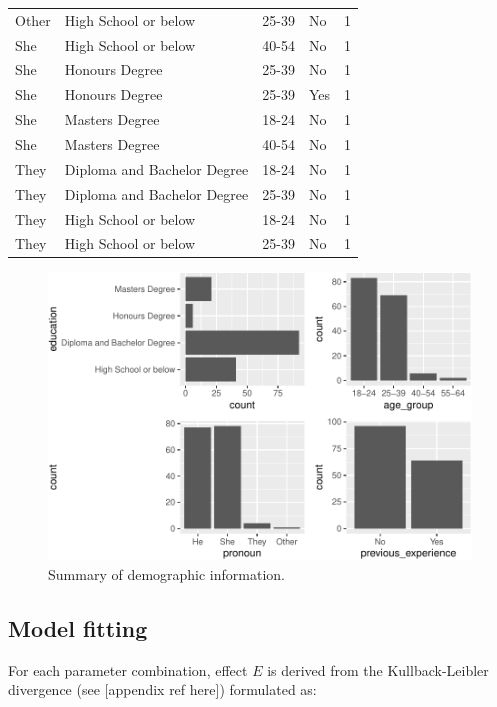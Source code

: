 \documentclass[]{interact}
\theoremstyle{plain}%
\theoremstyle{definition}
\theoremstyle{remark}
\begin{document}
\begin{table}
\begin{tabular}[t]{llllr}
Other & High School or below & 25-39 & No & 1\\
She & High School or below & 40-54 & No & 1\\
She & Honours Degree & 25-39 & No & 1\\
She & Honours Degree & 25-39 & Yes & 1\\
She & Masters Degree & 18-24 & No & 1\\
She & Masters Degree & 40-54 & No & 1\\
They & Diploma and Bachelor Degree & 18-24 & No & 1\\
They & Diploma and Bachelor Degree & 25-39 & No & 1\\
They & High School or below & 18-24 & No & 1\\
They & High School or below & 25-39 & No & 1\\
\bottomrule
\end{tabular}
\end{table}

\begin{figure}
\centering
\includegraphics{paper_comparison_files/figure-latex/demographic-summary-plot-1.pdf}
\caption{Summary of demographic information.
\label{fig:demographic-summary-plot}}
\end{figure}

\hypertarget{model-fitting}{%
\subsection{Model fitting}\label{model-fitting}}

For each parameter combination, effect \(E\) is derived from the
Kullback-Leibler divergence (see {[}appendix ref here{]}) formulated as:
\end{document}
